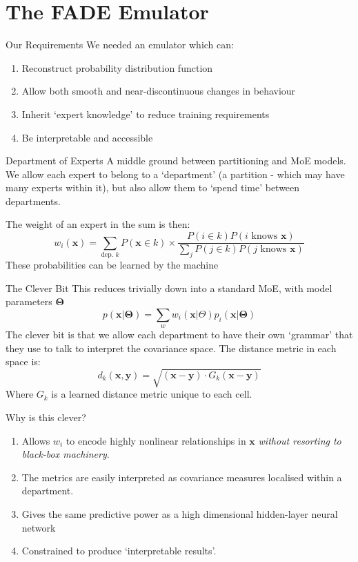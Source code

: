 \documentclass[aspectratio=169]{beamer}
\renewcommand{\vec}[1]{\mathbf{\boldsymbol{#1}}}
\def\pitem{\pause\item}
\begin{document}
	\section{The FADE Emulator}
		\begin{frame}{Our Requirements}
			We needed an emulator which can:
			\begin{enumerate}
				\pitem Reconstruct probability distribution function
				\pitem Allow both smooth and near-discontinuous changes in behaviour
				\pitem Inherit `expert knowledge' to reduce training requirements
				\pitem Be interpretable and accessible
			\end{enumerate}
		\end{frame}

		\begin{frame}{Department of Experts}
			A middle ground between partitioning and MoE models. We allow each expert to belong to a `department' (a partition - which may have many experts within it), but also allow them to `spend time' between departments.

			The weight of an expert in the sum is then:
			\begin{equation}
				w_i(\vec{x}) = \sum_{\text{dep. } k} P(\vec{x} \in k) \times  \frac{P(i \in k) P(i \text{ knows } \vec{x})}{\sum_j P(j \in k) P(j \text{ knows } \vec{x})}
			\end{equation}
			These probabilities can be learned by the machine
		\end{frame}
		\begin{frame}{The Clever Bit}
			This reduces trivially down into a standard MoE, with model parameters $\vec{\Theta}$
			\begin{equation}
				p(\vec{x}|\vec{\Theta}) = \sum_w w_i(\vec{x} | \Theta) p_i(\vec{x} | \vec{\Theta})
			\end{equation}
			The clever bit is that we allow each department to have their own `grammar' that they use to talk to interpret the covariance space. The distance metric in each space is:
			\begin{equation}
				d_k(\vec{x}, \vec{y}) = \sqrt{(\vec{x} - \vec{y})\cdot G_k (\vec{x} - \vec{y})}
			\end{equation}
			Where $G_k$ is a learned distance metric unique to each cell.
		\end{frame}

		\begin{frame}{Why is this clever?}

			\begin{enumerate}
				\pitem Allows $w_i$ to encode highly nonlinear relationships in $\vec{x}$ \textit{without resorting to black-box machinery}.
				\pitem The metrics are easily interpreted as covariance measures localised within a department.
				\pitem Gives the same predictive power as a high dimensional hidden-layer neural network
				\pitem Constrained to produce `interpretable results'.
			\end{enumerate}
		\end{frame}
\end{document}
